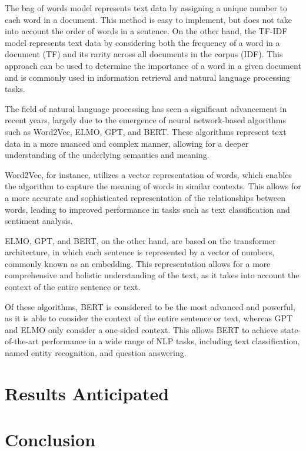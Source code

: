\documentclass[PI]{ProjectProposal}
\begin{document}
The bag of words model represents text data by assigning a unique number to each word in a document. This method is easy to implement, but does not take into account the order of words in a sentence. On the other hand, the TF-IDF model represents text data by considering both the frequency of a word in a document (TF) and its rarity across all documents in the corpus (IDF). This approach can be used to determine the importance of a word in a given document and is commonly used in information retrieval and natural language processing tasks.

The field of natural language processing has seen a significant advancement in recent years, largely due to the emergence of neural network-based algorithms such as Word2Vec, ELMO, GPT, and BERT. These algorithms represent text data in a more nuanced and complex manner, allowing for a deeper understanding of the underlying semantics and meaning.

Word2Vec, for instance, utilizes a vector representation of words, which enables the algorithm to capture the meaning of words in similar contexts. This allows for a more accurate and sophisticated representation of the relationships between words, leading to improved performance in tasks such as text classification and sentiment analysis.

ELMO, GPT, and BERT, on the other hand, are based on the transformer architecture, in which each sentence is represented by a vector of numbers, commonly known as an embedding. This representation allows for a more comprehensive and holistic understanding of the text, as it takes into account the context of the entire sentence or text.

Of these algorithms, BERT is considered to be the most advanced and powerful, as it is able to consider the context of the entire sentence or text, whereas GPT and ELMO only consider a one-sided context. This allows BERT to achieve state-of-the-art performance in a wide range of NLP tasks, including text classification, named entity recognition, and question answering.

\chapter{Results Anticipated}
\label{sec:org046eebe}
\chapter{Conclusion}
\label{sec:org19b0260}
\putbibliography
\appendix
\end{document}
